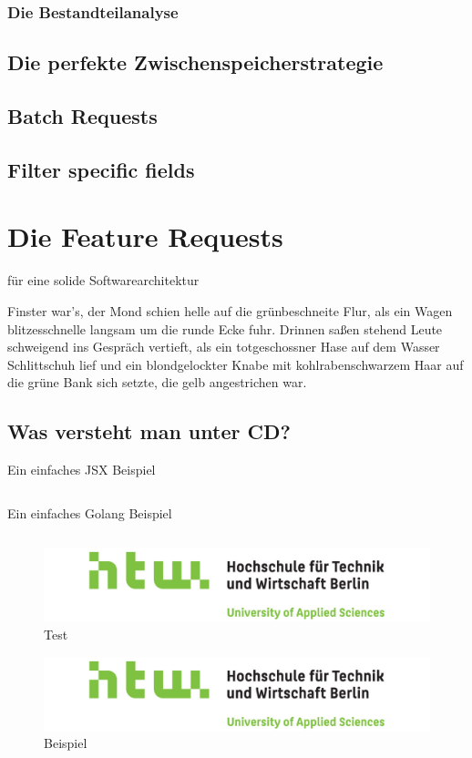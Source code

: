 \subsection{Die Bestandteilanalyse}

\section{Die perfekte Zwischenspeicherstrategie}

\section{Batch Requests}

\section{Filter specific fields}

\chapter{Die Feature Requests}

für eine solide Softwarearchitektur

Finster war's, der Mond schien helle auf die grünbeschneite Flur, als
ein Wagen blitzesschnelle langsam um die runde Ecke fuhr. Drinnen
saßen stehend Leute schweigend ins Gespräch vertieft, als ein
totgeschossner Hase auf dem Wasser Schlittschuh lief und ein
blondgelockter Knabe mit kohlrabenschwarzem Haar auf die grüne Bank
sich setzte, die gelb angestrichen war.

\section{Was versteht man unter CD?}
\label{sec:was-versteht-man-unter-cd}


\begin{listing}
    \label{lst:HelloJSX}
    \caption{Ein einfaches JSX Beispiel}
    \inputminted{jsx}{snippets/examples/Welcome.jsx}
\end{listing}

\begin{listing}
    \label{lst:Golang}
    \caption{Ein einfaches Golang Beispiel}
    \inputminted{go}{snippets/examples/hello.go}
\end{listing}

\newpage

\begin{figure}
    \label{figure:test}
    \includegraphics[scale=0.2]{img/HTW}
    \caption{Test}
\end{figure}

\begin{figure}
    \label{figure:beispiel}
    \includegraphics[scale=0.2]{img/HTW}
    \caption{Beispiel}
\end{figure}
